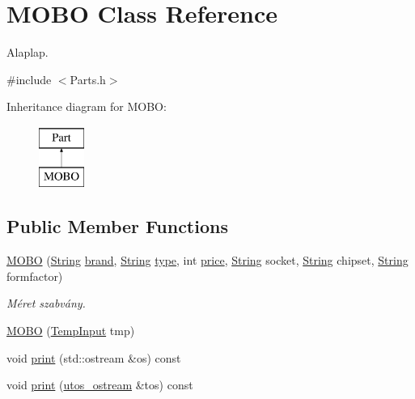 \hypertarget{class_m_o_b_o}{}\section{M\+O\+BO Class Reference}
\label{class_m_o_b_o}


Alaplap.  




{\ttfamily \#include $<$Parts.\+h$>$}

Inheritance diagram for M\+O\+BO\+:\begin{figure}[H]
\begin{center}
\leavevmode
\includegraphics[height=2.000000cm]{class_m_o_b_o}
\end{center}
\end{figure}
\subsection*{Public Member Functions}
\begin{DoxyCompactItemize}
\item 
\mbox{\hyperlink{class_m_o_b_o_a3185de871765391ae3a0ffe4b0af7e5b}{M\+O\+BO}} (\mbox{\hyperlink{class_string}{String}} \mbox{\hyperlink{class_part_ae06f2fdeb7fbbdb229a7aca151f3e341}{brand}}, \mbox{\hyperlink{class_string}{String}} \mbox{\hyperlink{class_part_a101dbcc5c4b21564df7414c7eb0eae88}{type}}, int \mbox{\hyperlink{class_part_a8e71223aed1da95a974f33d8d6c91bb1}{price}}, \mbox{\hyperlink{class_string}{String}} socket, \mbox{\hyperlink{class_string}{String}} chipset, \mbox{\hyperlink{class_string}{String}} formfactor)
\begin{DoxyCompactList}\small\item\em Méret szabvány. \end{DoxyCompactList}\item 
\mbox{\hyperlink{class_m_o_b_o_ad6b4b2daac75d63d5d7f490d3cfeee6f}{M\+O\+BO}} (\mbox{\hyperlink{struct_temp_input}{Temp\+Input}} tmp)
\item 
void \mbox{\hyperlink{class_m_o_b_o_a3241f425030e01d5b7a192c23af2dbda}{print}} (std\+::ostream \&os) const
\item 
void \mbox{\hyperlink{class_m_o_b_o_a4c78cec3a2a3e4d4480855622f50bd06}{print}} (\mbox{\hyperlink{structutos__ostream}{utos\+\_\+ostream}} \&tos) const
\end{DoxyCompactItemize}
